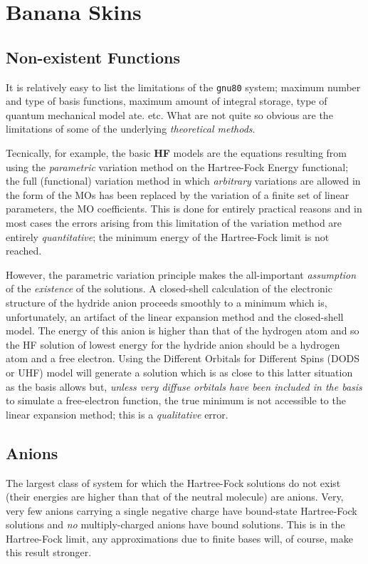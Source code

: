 \chapter{\sf Banana Skins}
\label{bananas}
\section{\sf Non-existent Functions}
It is relatively easy to list the limitations of the {\tt gnu80}
system; maximum number and type of basis functions, maximum
amount of integral storage, type of quantum mechanical model ate. etc.
What are not quite so obvious are the limitations of some of the 
underlying {\em theoretical methods}.

Tecnically, for example, the basic {\bf HF} models are the
equations resulting from using the {\em parametric} variation method
on the Hartree-Fock Energy functional; the full (functional) variation
method in which {\em arbitrary} variations are allowed in the form of the MOs
has been replaced by the variation of a finite set of linear parameters,
the MO coefficients. This is done for entirely practical reasons and
in most cases the errors arising from this limitation of the
variation method are entirely {\em quantitative}; the minimum energy
of the Hartree-Fock limit is not reached. 

However, the parametric variation principle makes the all-important
{\em assumption} of the {\em existence} of the solutions. A closed-shell
calculation of the electronic structure of the hydride anion proceeds
smoothly to a minimum which is, unfortunately, an artifact of
the linear expansion method and the closed-shell model. The energy of
this anion is higher than that of the hydrogen atom and so the HF
solution of lowest energy for the hydride anion should be a hydrogen atom
and a free electron. Using the Different Orbitals for Different Spins
(DODS or UHF) model will generate a solution which is as close to this
latter situation as the basis allows but, {\em unless very diffuse
orbitals have been included in the basis} to simulate a free-electron
function, the true minimum is not accessible to the linear expansion
method; this is a {\em qualitative} error.
\begin{center}
\end{center}
\section{\sf Anions}
The largest class of system for which the Hartree-Fock solutions
do not exist (their energies are higher than that of the neutral
molecule) are anions. Very, very few anions carrying a single negative
charge have bound-state Hartree-Fock solutions and {\em no}
multiply-charged anions have bound solutions. This is in the
Hartree-Fock limit, any approximations due to finite bases will,
of course, make this result stronger.

